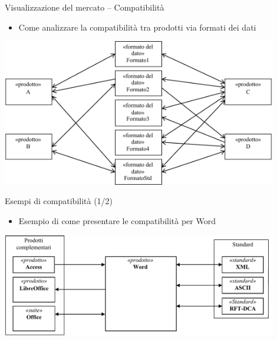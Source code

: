 \documentclass{beamer}
\begin{document}
\begin{frame}
{\centerline{Visualizzazione del mercato -- Compatibilit\`{a}}}
\begin{itemize}
    \item Come analizzare la compatibilit\`{a} tra prodotti via formati dei dati
\end{itemize} 
\begin{center}
    \includegraphics[width=0.9\textwidth]{P2023.AIBCCSS.IlConcettoDiSoftware/CompatibilitaProdotti.pdf}
\end{center}

\end{frame}
\begin{frame}
{\centerline{Esempi di compatibilit\`{a} (1/2)}}
\begin{itemize}
    \item Esempio di come presentare le compatibilit\`{a} per Word
\end{itemize} 
\begin{center}
    \includegraphics[width=0.9\textwidth]{P2023.AIBCCSS.IlConcettoDiSoftware/EsempiCompatibilita.1.pdf}
\end{center}

\end{frame}
\end{document}
